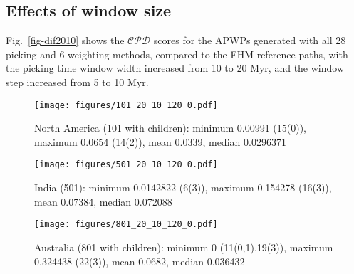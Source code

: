 \subsection{Effects of window size}

Fig.~\ref{fig-dif2010} shows the $\mathcal{CPD}$ scores for the APWPs generated
with all 28 picking and 6 weighting methods, compared to the FHM reference
paths, with the picking time window width increased from 10 to 20 Myr, and the
window step increased from 5 to 10 Myr.

\begin{figure*}
	\centering
	\begin{subfigure}{.96\textwidth}
		\texttt{[image: figures/101\_20\_10\_120\_0.pdf]}
		\caption{North America (101 with children): minimum 0.00991 (15(0)),
		maximum 0.0654 (14(2)), mean 0.0339, median 0.0296371}\label{fig-na-dif2010}
	\end{subfigure}
	\vspace{.1em}
	\begin{subfigure}{.96\textwidth}
		\texttt{[image: figures/501\_20\_10\_120\_0.pdf]}
		\caption{India (501): minimum 0.0142822 (6(3)), maximum 0.154278 (16(3)),
		mean 0.07384, median 0.072088}\label{fig-in-dif2010}
	\end{subfigure}
	\vspace{.1em}
	\begin{subfigure}{.96\textwidth}
		\texttt{[image: figures/801\_20\_10\_120\_0.pdf]}
		\caption{Australia (801 with children): minimum 0 (11(0,1),19(3)), maximum
		0.324438 (22(3)), mean 0.0682, median 0.036432}\label{fig-au-dif2010}
	\end{subfigure}
	\caption[Differences of each plate's paleomagnetic APWPs versus its FHM
predicted APWP]{As Fig.~\ref{fig-dif}, here the paths are generated in 20 Myr
bin and 10 Myr step. The difference values less than one-standard-deviation
interval of the whole 168 values are colored in green, more than
one-standard-deviation interval colored in red. Compare the numbers of picked
paleopoles with those in Fig.~\ref{fig-dif}.}\label{fig-dif2010}
\end{figure*}

